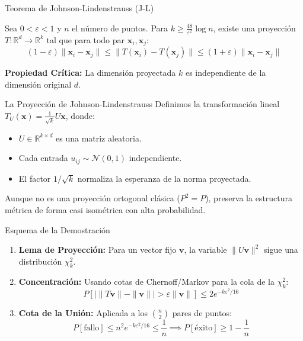 \documentclass[
    12pt,
    aspectratio=1610,
    c,
    spanish,
    intlimits,
    handout,
    leqno,
    professionalfonts,
]{beamer}
\begin{document}
\begin{frame}{Teorema de Johnson-Lindenstrauss (J-L)}
	\begin{theorem}
		Sea $0 < \varepsilon < 1$ y $n$ el número de puntos. Para $k \geq \frac{48}{\varepsilon^2} \log n$, existe una proyección $T: \mathbb{R}^d \to \mathbb{R}^k$ tal que para todo par $\symbf{x}_i, \symbf{x}_j$:
		\[ (1-\varepsilon) \|\symbf{x}_i - \symbf{x}_j\| \leq \|T(\symbf{x}_i) - T(\symbf{x}_j)\| \leq (1+\varepsilon) \|\symbf{x}_i - \symbf{x}_j\| \]
	\end{theorem}
	\vfill
	\textbf{Propiedad Crítica:} La dimensión proyectada $k$ es independiente de la dimensión original $d$.
\end{frame}

\begin{frame}{La Proyección de Johnson-Lindenstrauss}
	Definimos la transformación lineal $T_{U}(\symbf{x}) = \frac{1}{\sqrt{k}} U \symbf{x}$, donde:
	\vfill
	\begin{itemize}
		\item $U \in \mathbb{R}^{k \times d}$ es una matriz aleatoria.
		\item Cada entrada $u_{ij} \sim \mathcal{N}(0, 1)$ independiente.
		\item El factor $1/\sqrt{k}$ normaliza la esperanza de la norma proyectada.
	\end{itemize}
	\vfill
	\begin{note}
		Aunque no es una proyección ortogonal clásica ($P^2=P$), preserva la estructura métrica de forma casi isométrica con alta probabilidad.
	\end{note}
\end{frame}

\begin{frame}{Esquema de la Demostración}
	\begin{enumerate}
		\item \textbf{Lema de Proyección:} Para un vector fijo $\symbf{v}$, la variable $\|U\symbf{v}\|^2$ sigue una distribución $\chi^2_k$.
		\item \textbf{Concentración:} Usando cotas de Chernoff/Markov para la cola de la $\chi^2_k$:
		      \[ P[ |\|T\symbf{v}\| - \|\symbf{v}\|| > \varepsilon \|\symbf{v}\| ] \leq 2 e^{-k \varepsilon^2 / 16} \]
		\item \textbf{Cota de la Unión:} Aplicada a los $\binom{n}{2}$ pares de puntos:
		      \[ P[\text{fallo}] \leq n^2 e^{-k \varepsilon^2 / 16} \leq \frac{1}{n} \implies P[\text{éxito}] \geq 1 - \frac{1}{n} \]
	\end{enumerate}
\end{frame}
\end{document}
